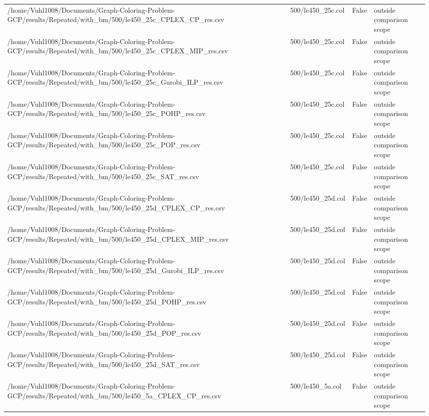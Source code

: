 \begin{table}[htbp]
\begin{tabular}{llll}
/home/Vuhl1008/Documents/Graph-Coloring-Problem-GCP/results/Repeated/with\_bm/500/le450\_25c\_CPLEX\_CP\_res.csv & 500/le450\_25c.col & False & outside comparison scope \\
/home/Vuhl1008/Documents/Graph-Coloring-Problem-GCP/results/Repeated/with\_bm/500/le450\_25c\_CPLEX\_MIP\_res.csv & 500/le450\_25c.col & False & outside comparison scope \\
/home/Vuhl1008/Documents/Graph-Coloring-Problem-GCP/results/Repeated/with\_bm/500/le450\_25c\_Gurobi\_ILP\_res.csv & 500/le450\_25c.col & False & outside comparison scope \\
/home/Vuhl1008/Documents/Graph-Coloring-Problem-GCP/results/Repeated/with\_bm/500/le450\_25c\_POHP\_res.csv & 500/le450\_25c.col & False & outside comparison scope \\
/home/Vuhl1008/Documents/Graph-Coloring-Problem-GCP/results/Repeated/with\_bm/500/le450\_25c\_POP\_res.csv & 500/le450\_25c.col & False & outside comparison scope \\
/home/Vuhl1008/Documents/Graph-Coloring-Problem-GCP/results/Repeated/with\_bm/500/le450\_25c\_SAT\_res.csv & 500/le450\_25c.col & False & outside comparison scope \\
/home/Vuhl1008/Documents/Graph-Coloring-Problem-GCP/results/Repeated/with\_bm/500/le450\_25d\_CPLEX\_CP\_res.csv & 500/le450\_25d.col & False & outside comparison scope \\
/home/Vuhl1008/Documents/Graph-Coloring-Problem-GCP/results/Repeated/with\_bm/500/le450\_25d\_CPLEX\_MIP\_res.csv & 500/le450\_25d.col & False & outside comparison scope \\
/home/Vuhl1008/Documents/Graph-Coloring-Problem-GCP/results/Repeated/with\_bm/500/le450\_25d\_Gurobi\_ILP\_res.csv & 500/le450\_25d.col & False & outside comparison scope \\
/home/Vuhl1008/Documents/Graph-Coloring-Problem-GCP/results/Repeated/with\_bm/500/le450\_25d\_POHP\_res.csv & 500/le450\_25d.col & False & outside comparison scope \\
/home/Vuhl1008/Documents/Graph-Coloring-Problem-GCP/results/Repeated/with\_bm/500/le450\_25d\_POP\_res.csv & 500/le450\_25d.col & False & outside comparison scope \\
/home/Vuhl1008/Documents/Graph-Coloring-Problem-GCP/results/Repeated/with\_bm/500/le450\_25d\_SAT\_res.csv & 500/le450\_25d.col & False & outside comparison scope \\
/home/Vuhl1008/Documents/Graph-Coloring-Problem-GCP/results/Repeated/with\_bm/500/le450\_5a\_CPLEX\_CP\_res.csv & 500/le450\_5a.col & False & outside comparison scope \\

\end{tabular}
\end{table}
